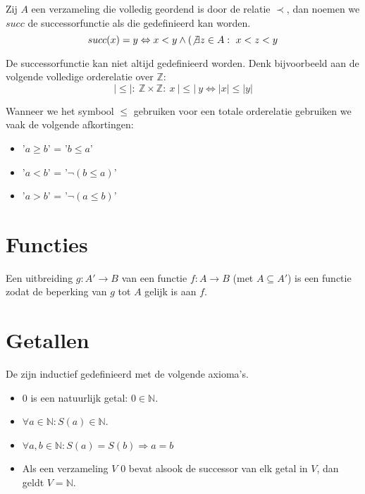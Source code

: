 \documentclass[main.tex]{subfiles}
\begin{document}
\begin{de}
  Zij $A$ een verzameling die volledig geordend is door de relatie $\prec$, dan noemen we $succ$ de successorfunctie als die gedefinieerd kan worden.
  \[ succ(x) = y \Leftrightarrow x < y \wedge (\not\exists z \in A:\ x < z < y \]
\end{de}

\begin{opm}
  De successorfunctie kan niet altijd gedefinieerd worden.
  Denk bijvoorbeeld aan de volgende volledige orderelatie over $\mathbb{Z}$:
  \[ |\le|:\ \mathbb{Z} \times \mathbb{Z}:\ x\ |\le|\ y \Leftrightarrow |x| \le |y| \]
\end{opm}

\begin{de}
  Wanneer we het symbool $\le$ gebruiken voor een totale orderelatie gebruiken we vaak de volgende afkortingen:
  \begin{itemize}
  \item '$a \ge b$' = '$b \le a$'
  \item '$a < b$' = '$\neg(b \le a)$'
  \item '$a > b$' = '$\neg(a \le b)$'
  \end{itemize}
\end{de}

\section{Functies}
\label{sec:functies}


\begin{de}
  Een uitbreiding $g:A' \rightarrow B$ van een functie $f:A \rightarrow B$ (met $A \subseteq A'$) is een functie zodat de beperking van $g$ tot $A$ gelijk is aan $f$.
\end{de}

\section{Getallen}
\label{sec:getallen}


\begin{de}
  De  zijn inductief gedefinieerd met de volgende axioma's.
  \begin{itemize}
  \item $0$ is een natuurlijk getal: $0 \in \mathbb{N}$.
  \item $\forall a \in \mathbb{N}: S(a) \in \mathbb{N}$.
  \item $\forall a,b\in \mathbb{N}: S(a) = S(b) \Rightarrow a=b$
  \item Als een verzameling $V$ $0$ bevat alsook de successor van elk getal in $V$, dan geldt $V=\mathbb{N}$.
  \end{itemize}
\end{de}
\end{document}
